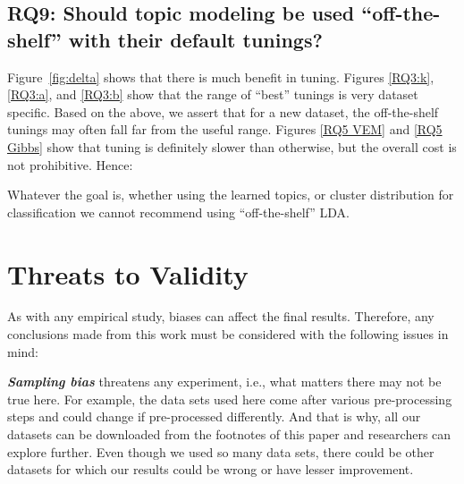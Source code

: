 \documentclass[twocolumn,5p,sort&compress]{elsarticle}
\newcommand{\bi}{\begin{itemize}}
\newcommand{\ei}{\end{itemize}}
\theoremstyle{break}
\begin{document}
\subsection{\textbf{RQ9: Should topic modeling be used ``off-the-shelf'' with their default tunings?}}
\label{sect:rq9}

  Figure~\ref{fig:delta} shows that there is much benefit in tuning.
  Figures \ref{RQ3:k}, \ref{RQ3:a}, and \ref{RQ3:b} show that
  the range of ``best'' tunings is very dataset specific. 
    Based on the above, we assert that
  for a new dataset,
  the off-the-shelf tunings
  may often fall far from the useful range.
  Figures \ref{RQ5 VEM} and \ref{RQ5 Gibbs} show that tuning is definitely
  slower than otherwise, but the overall cost is not prohibitive.
  Hence:
  \begin{lesson}
    Whatever the goal is, whether using the learned topics, or cluster distribution for classification
    we cannot recommend using ``off-the-shelf'' LDA.
  \end{lesson}



\section{Threats to Validity}
\label{sect:validity}

As with any empirical study, biases can affect the final
results. Therefore, any conclusions made from this work must be considered with the following issues in mind:

\textbf{\textit{Sampling bias}} threatens any experiment, i.e., what matters there may not be true here. For example,
the data sets used here come after various pre-processing steps and could change if pre-processed differently. And that is why, all our datasets can be downloaded from the footnotes of this paper and researchers can explore further. Even though we used so many data sets, there could be other datasets for which our results could be wrong or have lesser improvement.
\end{document}
